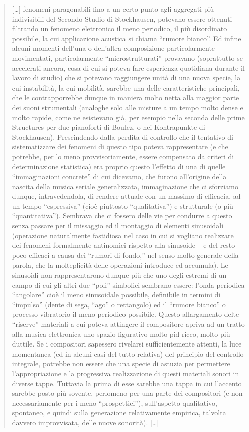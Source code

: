 \begin{quote}
[\ldots] fenomeni paragonabili fino a un certo punto agli aggregati più indivisibili del Secondo Studio di Stockhausen, potevano essere ottenuti filtrando un fenomeno elettronico il meno periodico, il più disordinato possibile, la cui applicazione acustica si chiama “rumore bianco”. Ed infine alcuni momenti dell’una o dell’altra composizione particolarmente movimentati, particolarmente “microstrutturati” provavano (soprattutto se accelerati ancora, cosa di cui si poteva fare esperienza quotidiana durante il lavoro di studio) che si potevano raggiungere unità di una nuova specie, la cui instabilità, la cui mobilità, sarebbe una delle caratteristiche principali, che le contrapporrebbe dunque in maniera molto netta alla maggior parte dei suoni strumentali (analoghe solo alle misture a un tempo molto dense e molto rapide, come ne esistevano già, per esempio nella seconda delle prime Structures per due pianoforti di Boulez, o nei Kontrapunkte di Stockhausen). Prescindendo dalla perdita di controllo che il tentativo di sistematizzare dei fenomeni di questo tipo poteva rappresentare (e che potrebbe, per lo meno provvisoriamente, essere compensato da criteri di determinazione statistica) era proprio questo l’effetto di una di quelle “immaginazioni concrete” di cui dicevamo, che furono all’origine della nascita della musica seriale generalizzata, immaginazione che ci sforziamo dunque, intravedendola, di rendere attuale con un massimo di efficacia, ad un tempo “espressiva” (cioè piuttosto “qualitativa”) e strutturale (o più “quantitativa”). Sembrava che ci fossero delle vie per condurre a questo senza passare per il missaggio ed il montaggio di elementi sinusoidali (operazione naturalmente fastidiosa nel caso in cui si vogliano realizzare dei fenomeni formalmente antinomici rispetto alla sinusoide – e del resto poco efficaci a causa dei “rumori di fondo,” nel senso molto generale della parola, che la molteplicità delle operazioni introduce ed accumula). Le sinusoidi non rappresentarono dunque più che uno degli estremi di un campo di cui gli altri due “poli” simbolici sembrano essere: l’onda periodica “angolare” cioè il meno sinusoidale possibile, definibile in termini di “impulso” (dente di sega, “ago” o rettangolo) ed il “rumore bianco” o processo vibratorio il meno periodico possibile. Questo allargamento delte “riserve” materiali a cui poteva attingere il compositore apriva ad un tratto alla musica elettronica uno spazio figurativo molto pid ricco, molto più duttile. Se i compositori sapessero rivelarsi sufficientemente attenti, la luce momentanea (ed in alcuni casi del tutto relativa) del principio del controllo integrale, potrebbe non essere che una specie di astuzia per permettere l’appropriazione e la progressiva realizzazione di questi materiali sonori in diverse tappe. Tuttavia la prima di esse sarebbe una tappa in cui l’accento sarebbe posto più sovente, perlomeno per una parte dei compositori (e non necessariamente per i meno “prospettici”), sull’aspetto qualitativo, spontaneo, e quindi sulla generazione relativamente empirica, talvolta davvero improvvisata, delle nuove sonorità).
[\ldots]

\end{quote}

